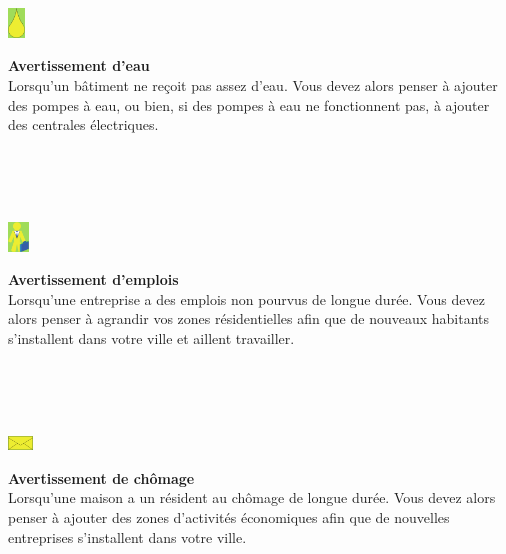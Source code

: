 \documentclass[11pt]{report}
\begin{document}
\\
\\
\\
\begin{minipage}{0.1\textwidth}
	\begin{center}
		\includegraphics[height=30px]{water_warning}
	\end{center}
\end{minipage}
\begin{minipage}{0.85\textwidth}
	\textbf{Avertissement d'eau}\\
	Lorsqu'un bâtiment ne reçoit pas assez d'eau. Vous devez alors penser à ajouter des pompes à eau, ou bien, si des pompes à eau ne fonctionnent pas, à ajouter des centrales électriques.
\end{minipage}
\\
\\
\\
\begin{minipage}{0.1\textwidth}
	\begin{center}
		\includegraphics[height=30px]{workforce_warning}
	\end{center}
\end{minipage}
\begin{minipage}{0.85\textwidth}
	\textbf{Avertissement d'emplois}\\
	Lorsqu'une entreprise a des emplois non pourvus de longue durée. Vous devez alors penser à agrandir vos zones résidentielles afin que de nouveaux habitants s'installent dans votre ville et aillent travailler.
\end{minipage}
\\
\\
\\
\begin{minipage}{0.1\textwidth}
	\begin{center}
		\includegraphics[width=25px]{employement_warning}
	\end{center}
\end{minipage}
\begin{minipage}{0.85\textwidth}
	\textbf{Avertissement de chômage}\\
	Lorsqu'une maison a un résident au chômage de longue durée. Vous devez alors penser à ajouter des zones d'activités économiques afin que de nouvelles entreprises s'installent dans votre ville.
\end{minipage}
\end{document}
